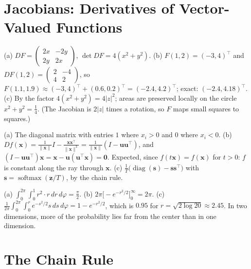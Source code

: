\documentclass[11pt]{article}
\newcommand{\norm}[1]{\lVert #1 \rVert}
\DeclareMathOperator{\diag}{diag}
\DeclareMathOperator{\softmax}{softmax}
\begin{document}
\section*{Jacobians: Derivatives of Vector-Valued Functions}

\begin{description}[leftmargin=0pt, itemsep=0.3em]
    \item[\ref{pr:jacobian-squaring}.] (a) $DF = \begin{pmatrix} 2x & -2y \\ 2y & 2x \end{pmatrix}$, $\det DF = 4(x^2 + y^2)$. (b) $F(1, 2) = (-3, 4)^\top$ and $DF(1, 2) = \begin{pmatrix} 2 & -4 \\ 4 & 2 \end{pmatrix}$, so $F(1.1, 1.9) \approx (-3, 4)^\top + (0.6, 0.2)^\top = (-2.4, 4.2)^\top$; exact: $(-2.4, 4.18)^\top$. (c) By the factor $4(x^2 + y^2) = 4|z|^2$; areas are preserved locally on the circle $x^2 + y^2 = \frac{1}{4}$. (The Jacobian is $2|z|$ times a rotation, so $F$ maps small squares to squares.)
    \item[\ref{pr:jacobians-ml}.] (a) The diagonal matrix with entries $1$ where $x_i > 0$ and $0$ where $x_i < 0$. (b) $Df(\mathbf{x}) = \frac{1}{\norm{\mathbf{x}}}I - \frac{\mathbf{x}\mathbf{x}^\top}{\norm{\mathbf{x}}^3} = \frac{1}{\norm{\mathbf{x}}}(I - \mathbf{u}\mathbf{u}^\top)$, and $(I - \mathbf{u}\mathbf{u}^\top)\mathbf{x} = \mathbf{x} - \mathbf{u}(\mathbf{u}^\top\mathbf{x}) = \mathbf{0}$. Expected, since $f(t\mathbf{x}) = f(\mathbf{x})$ for $t > 0$: $f$ is constant along the ray through $\mathbf{x}$. (c) $\frac{1}{T}\big(\diag(\mathbf{s}) - \mathbf{s}\mathbf{s}^\top\big)$ with $\mathbf{s} = \softmax(\mathbf{z}/T)$, by the chain rule.
    \item[\ref{pr:polar-integrals}.] (a) $\int_0^{2\pi}\int_0^1 r^2 \cdot r \, dr \, d\varphi = \frac{\pi}{2}$. (b) $2\pi\big[-e^{-r^2/2}\big]_0^\infty = 2\pi$. (c) $\frac{1}{2\pi}\int_0^{2\pi}\int_0^r e^{-s^2/2}s \, ds \, d\varphi = 1 - e^{-r^2/2}$, which is $0.95$ for $r = \sqrt{2\log 20} \approx 2.45$. In two dimensions, more of the probability lies far from the center than in one dimension.
\end{description}

\section*{The Chain Rule}
\end{document}
